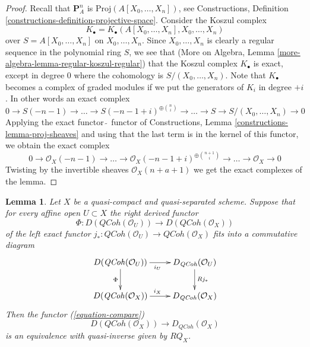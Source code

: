 \documentclass{amsart}
\theoremstyle{plain}
\newtheorem{lemma}[subsection]{Lemma}
\theoremstyle{definition}
\theoremstyle{remark}
\numberwithin{equation}{subsection}
\def\QCoh{\mathit{QCoh}}
\begin{document}
\begin{proof}
Recall that $\mathbf{P}^n_A$ is $\text{Proj}(A[X_0, \ldots, X_n])$, see
Constructions, Definition \ref{constructions-definition-projective-space}.
Consider the Koszul complex
$$
K_\bullet = K_\bullet(A[X_0, \ldots, X_n], X_0, \ldots, X_n)
$$
over $S = A[X_0, \ldots, X_n]$ on $X_0, \ldots, X_n$.
Since $X_0, \ldots, X_n$ is clearly a regular sequence in the
polynomial ring $S$, we see that
(More on Algebra, Lemma \ref{more-algebra-lemma-regular-koszul-regular})
that the Koszul complex $K_\bullet$ is exact, except in degree $0$
where the cohomology is $S/(X_0, \ldots, X_n)$.
Note that $K_\bullet$ becomes a complex of graded modules if we
put the generators of $K_i$ in degree $+i$. In other words an
exact complex
$$
0 \to S(-n - 1) \to \ldots \to S(-n - 1 + i)^{\oplus {n \choose i}} \to \ldots
\to S \to S/(X_0, \ldots, X_n) \to 0
$$
Applying the exact functor $\tilde{\ }$ functor of Constructions, 
Lemma \ref{constructions-lemma-proj-sheaves} and using that
the last term is in the kernel of this functor,
we obtain the exact complex
$$
0 \to \mathcal{O}_X(-n - 1) \to \ldots
\to \mathcal{O}_X(-n - 1 + i)^{\oplus {n + 1 \choose i}} \to
\ldots \to \mathcal{O}_X \to 0
$$
Twisting by the invertible sheaves $\mathcal{O}_X(n + a + 1)$
we get the exact complexes of the lemma.
\end{proof}


\begin{lemma}
\label{lemma-argument-proves}
Let $X$ be a quasi-compact and quasi-separated scheme. Suppose that
for every affine open $U \subset X$ the right derived functor
$$
\Phi : D(\QCoh(\mathcal{O}_U)) \to D(\QCoh(\mathcal{O}_X))
$$
of the left exact functor
$j_* : \QCoh(\mathcal{O}_U) \to \QCoh(\mathcal{O}_X)$
fits into a commutative diagram
$$
\xymatrix{
D(\QCoh(\mathcal{O}_U)) \ar[d]_\Phi \ar[r]_{i_U} &
D_\QCoh(\mathcal{O}_U) \ar[d]^{Rj_*} \\
D(\QCoh(\mathcal{O}_X)) \ar[r]^{i_X} &
D_\QCoh(\mathcal{O}_X)
}
$$
Then the functor (\ref{equation-compare})
$$
D(\QCoh(\mathcal{O}_X))
\longrightarrow
D_\QCoh(\mathcal{O}_X)
$$
is an equivalence with quasi-inverse given by $RQ_X$.
\end{lemma}
\end{document}
